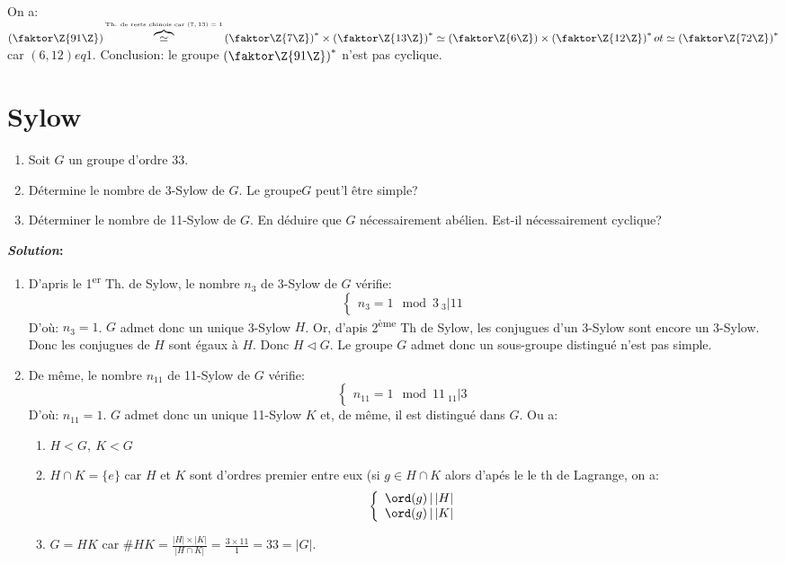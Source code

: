 \begin{remark}
	On a: $\left(\faktor\Z{91\Z}\right)\overbrace{\simeq}^{\mbox{\tiny Th. de rests chinois car $(7,13)=1$}} \left(\faktor\Z{7\Z}\right)^\ast\times \left(\faktor\Z{13\Z}\right)^\ast\simeq \left(\faktor\Z{6\Z}\right)\times \left(\faktor\Z{12\Z}\right)^\ast ot\simeq \left(\faktor\Z{72\Z}\right)^\ast$ car $(6,12) eq 1$. Conclusion: le groupe $\left(\faktor\Z{91\Z}\right)^\ast$ n'est pas cyclique.
\end{remark}

\section{Sylow}

\begin{exercise}
	\begin{enumerate}
		\item Soit $G$ un groupe d'ordre 33.	
		\item Détermine le nombre de 3-Sylow de $G$. Le groupe$G$ peut'l être simple?
		\item Déterminer le nombre de 11-Sylow de $G$. En déduire que $G$ nécessairement abélien. Est-il nécessairement cyclique?
	\end{enumerate}
		\textbf{\emph{Solution}:}

	\begin{enumerate}
		\item D'apris le 1\textsuperscript{er} Th. de Sylow, le nombre $n_3$ de 3-Sylow de $G$ vérifie:
		$$\left\{\begin{array}{r}n_3 = 1\mod 3\ _3 | 11\end{array}\right.$$
		D'où: $n_3=1$. $G$ admet donc un unique 3-Sylow $H$. Or, d'apis 2\textsuperscript{ème} Th de Sylow, les conjugues d'un 3-Sylow sont encore un 3-Sylow. Donc les conjugues de $H$ sont égaux à $H$. Donc $H\lhd G$. Le groupe $G$ admet donc un sous-groupe distingué n'est pas simple.
		
		\item De même, le nombre $n_{11}$ de 11-Sylow de $G$ vérifie:
		$$\left\{\begin{array}{r}n_{11} = 1\mod 11\ _{11} | 3\end{array}\right.$$
		D'où: $n_{11}=1$.
		$G$ admet donc un unique 11-Sylow $K$ et, de même, il est distingué dans $G$.
		Ou a:
		\begin{enumerate}
			\item $H<  G,\ K<  G$
			\item $H\cap K=\{e\}$ car $H$ et $K$ sont d'ordres premier entre eux (si $g\in H\cap K$ alors d'apés le le th de Lagrange, on a:
			$$\left\{\begin{array}{r}\ord(g)\,|\, |H|\\\ord(g)\,|\, |K|\end{array}\right.$$
			\item $G=HK$ car $\#HK=\frac{|H|\times|K|}{|H\cap K|}=\frac{3\times 11}{1}=33=|G|$. 
		\end{enumerate}


\end{enumerate}
\end{exercise}
